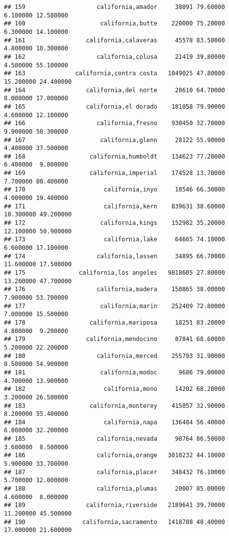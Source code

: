\documentclass[
]{article}
\begin{document}
\begin{verbatim}
## 159                    california,amador     38091 79.60000  6.100000 12.500000
## 160                     california,butte    220000 75.20000  6.300000 14.100000
## 161                 california,calaveras     45578 83.50000  4.800000 10.300000
## 162                    california,colusa     21419 39.80000  4.500000 55.100000
## 163              california,contra costa   1049025 47.80000 15.200000 24.400000
## 164                 california,del norte     28610 64.70000  8.000000 17.800000
## 165                 california,el dorado    181058 79.90000  4.600000 12.100000
## 166                    california,fresno    930450 32.70000  9.900000 50.300000
## 167                     california,glenn     28122 55.90000  4.400000 37.500000
## 168                  california,humboldt    134623 77.20000  6.400000  9.800000
## 169                  california,imperial    174528 13.70000  7.700000 80.400000
## 170                      california,inyo     18546 66.30000  4.000000 19.400000
## 171                      california,kern    839631 38.60000 10.300000 49.200000
## 172                     california,kings    152982 35.20000 12.100000 50.900000
## 173                      california,lake     64665 74.10000  6.600000 17.100000
## 174                    california,lassen     34895 66.70000 11.600000 17.500000
## 175               california,los angeles   9818605 27.80000 13.200000 47.700000
## 176                    california,madera    150865 38.00000  7.900000 53.700000
## 177                     california,marin    252409 72.80000  7.000000 15.500000
## 178                  california,mariposa     18251 83.20000  4.800000  9.200000
## 179                 california,mendocino     87841 68.60000  5.200000 22.200000
## 180                    california,merced    255793 31.90000  8.500000 54.900000
## 181                     california,modoc      9686 79.00000  4.700000 13.900000
## 182                      california,mono     14202 68.20000  3.200000 26.500000
## 183                  california,monterey    415057 32.90000  8.200000 55.400000
## 184                      california,napa    136484 56.40000  6.000000 32.200000
## 185                    california,nevada     98764 86.50000  3.600000  8.500000
## 186                    california,orange   3010232 44.10000  5.900000 33.700000
## 187                    california,placer    348432 76.10000  5.700000 12.800000
## 188                    california,plumas     20007 85.00000  4.600000  8.000000
## 189                 california,riverside   2189641 39.70000 11.200000 45.500000
## 190                california,sacramento   1418788 48.40000 17.000000 21.600000

\end{verbatim}
\end{document}
